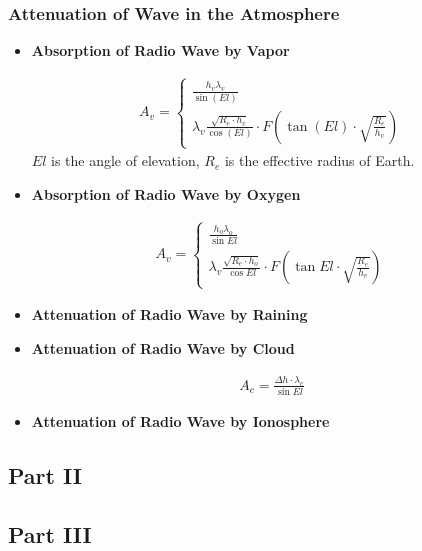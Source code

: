\documentclass{article}
\begin{document}
\subsubsection{Attenuation of Wave in the Atmosphere}
\begin{itemize}
    \item \textbf{Absorption of Radio Wave by Vapor}
    
    \begin{gather}
    \label{eqn:a_vapor}
    A_v = 
    \begin{cases}
    \displaystyle\frac{h_v\lambda_v}{\sin(El)}\\[14pt]
    \displaystyle\lambda_v\frac{\sqrt{R_e \cdot h_v}}{\cos(El)}\cdot F(\tan(El)\cdot \sqrt{\frac{R_e}{h_v}})
    \end{cases}
    \end{gather}
    $El$ is the angle of elevation, $R_e$ is the effective radius of Earth.
    
    \item \textbf{Absorption of Radio Wave by Oxygen}
    
    \begin{gather}
    \label{eqn:a_cloud}
    A_v = 
    \begin{cases}
    \displaystyle\frac{h_o\lambda_o}{\sin{El}}\\[12pt]
    \displaystyle\lambda_v\frac{\sqrt{R_e \cdot h_o}}{\cos{El}}\cdot F(\tan{El}\cdot \sqrt{\frac{R_e}{h_v}})
    \end{cases}
    \end{gather}
    
    \item \textbf{Attenuation of Radio Wave by Raining}
    
    
    
    \item \textbf{Attenuation of Radio Wave by Cloud}
    
    \begin{gather}
    \label{eqn:a_cloud}
    A_c = \displaystyle\frac{\Delta h \cdot \lambda_c}{\sin{El}}
    \end{gather}
    
    \item \textbf{Attenuation of Radio Wave by Ionosphere}
\end{itemize}
\subsection{Part II}
\subsection{Part III}
\end{document}
